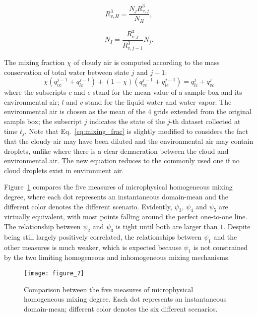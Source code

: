 \documentclass[draft,linenumbers]{agujournal}
\newcommand{\Eq}[1]{Eq.~\eqref{#1}}
\newcommand{\Fig}[1]{Figure~\ref{#1}}
\begin{document}
\begin{equation}
R_{v,H}^3 = \frac{N_jR_{v,j}^3}{N_H},
\end{equation}

\begin{equation}
N_I = \frac{R_{v,j}^3}{R_{v,j-1}^3}N_j.
\end{equation}

The mixing fraction $\chi$ of cloudy air is computed according to the mass conservation of total water between state $j$ and $j-1$:
\begin{equation}
\chi(q^{j-1}_{vc} + q^{j-1}_{lc}) + (1-\chi)(q^{j-1}_{ve} + q^{j-1}_{le}) = q^{j}_{lc} + q^{j}_{vc}
\label{eq:mixing_frac}
\end{equation}
where the subscripts $c$ and $e$ stand for the mean 
value of a sample box and its environmental air; $l$ and $v$ stand for the liquid 
water and water vapor. The environmental air is chosen as the mean of the $4$ 
grids extended from the original sample box; the subscript $j$ indicates the state of the $j$-th dataset 
collected at time $t_j$. Note that \Eq{eq:mixing_frac} is slightly modified to considers the fact that the cloudy air may have 
been diluted and the environmental air may contain droplets, 
{unlike \citet{Lu2013a,Lu2013b,Lu2014} where there is a clear demacration between the cloud and environmental air. The new equation reduces to the commonly used one if no cloud droplets exist in environment air.}

\Fig{phi_compare} compares the five measures of microphysical homogeneous mixing degree, where each dot represents an 
instantaneous domain-mean and the different color denotes the different scenario.
Evidently, $\psi_3$, $\psi_4$ and $\psi_5$ are virtually equivalent, with most points falling around the perfect one-to-one line. The relationship between $\psi_2$ and $\psi_3$ is tight until both are larger than $1$. Despite being still largely positively correlated, the relationships between $\psi_1$ and {the other measures is much weaker, which is expected because $\psi_1$ is not constrained by the two limiting homogeneous and inhomogeneous mixing mechanisms.} 

\begin{figure}[!htbp]\centering
\texttt{[image: figure\_7]}
\caption{Comparison between the five measures of microphysical homogeneous mixing degree. Each dot represents an instantaneous domain-mean; different color denotes the six different scenarios.\label{phi_compare}}
\end{figure}
\end{document}

